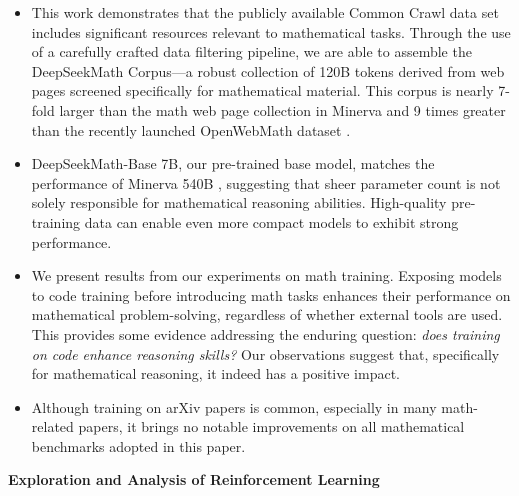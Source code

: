 \begin{itemize}[topsep=0pt]
    \item This work demonstrates that the publicly available Common Crawl data set includes significant resources relevant to mathematical tasks. Through the use of a carefully crafted data filtering pipeline, we are able to assemble the DeepSeekMath Corpus—a robust collection of 120B tokens derived from web pages screened specifically for mathematical material. This corpus is nearly 7-fold larger than the math web page collection in Minerva \citep{minerva} and 9 times greater than the recently launched OpenWebMath dataset \citep{openwebmath}.

\item DeepSeekMath-Base 7B, our pre-trained base model, matches the performance of Minerva 540B \citep{minerva}, suggesting that sheer parameter count is not solely responsible for mathematical reasoning abilities. High-quality pre-training data can enable even more compact models to exhibit strong performance.

\item We present results from our experiments on math training. Exposing models to code training before introducing math tasks enhances their performance on mathematical problem-solving, regardless of whether external tools are used. This provides some evidence addressing the enduring question: \textit{does training on code enhance reasoning skills?} Our observations suggest that, specifically for mathematical reasoning, it indeed has a positive impact.

    \item Although training on arXiv papers is common, especially in many math-related papers, it brings no notable improvements on all mathematical benchmarks adopted in this paper.
\end{itemize}

\textbf{Exploration and Analysis of Reinforcement Learning}

